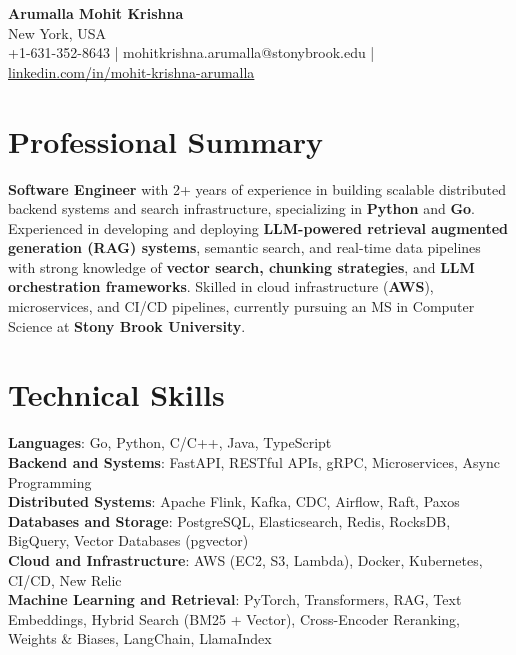\documentclass[letterpaper,11pt]{article}
\begin{document}
\begin{center}
  {\Large \textbf{Arumalla Mohit Krishna}} \\
  New York, USA \\
  +1-631-352-8643 \enspace | \enspace mohitkrishna.arumalla@stonybrook.edu \enspace | \enspace \href{https://www.linkedin.com/in/mohit-krishna-arumalla}{linkedin.com/in/mohit-krishna-arumalla}
\end{center}

\section{Professional Summary}
  \begin{itemize}[leftmargin=0.15in, label={}]
    \small{\item{
     \textbf{Software Engineer} with 2+ years of experience in building scalable distributed backend systems and search infrastructure, specializing in \textbf{Python} and \textbf{Go}. Experienced in developing and deploying \textbf{LLM-powered retrieval augmented generation (RAG) systems}, semantic search, and real-time data pipelines with strong knowledge of \textbf{vector search, chunking strategies}, and \textbf{LLM orchestration frameworks}. Skilled in cloud infrastructure (\textbf{AWS}), microservices, and CI/CD pipelines, currently pursuing an MS in Computer Science at \textbf{Stony Brook University}.
    }}
  \end{itemize}
\vspace{-16pt}

\section{Technical Skills}
 \begin{itemize}[leftmargin=0.15in, label={}]
    \small{\item{
     \textbf{Languages}: Go, Python, C/C++, Java, TypeScript \\
     \textbf{Backend and Systems}: FastAPI, RESTful APIs, gRPC, Microservices, Async Programming \\
     \textbf{Distributed Systems}: Apache Flink, Kafka, CDC, Airflow, Raft, Paxos \\
     \textbf{Databases and Storage}: PostgreSQL, Elasticsearch, Redis, RocksDB, BigQuery, Vector Databases (pgvector) \\
     \textbf{Cloud and Infrastructure}: AWS (EC2, S3, Lambda), Docker, Kubernetes, CI/CD, New Relic \\
     \textbf{Machine Learning and Retrieval}: PyTorch, Transformers, RAG, Text Embeddings, Hybrid Search (BM25 + Vector), Cross-Encoder Reranking, Weights \& Biases, LangChain, LlamaIndex
    }}
 \end{itemize}
\vspace{-16pt}
\end{document}
